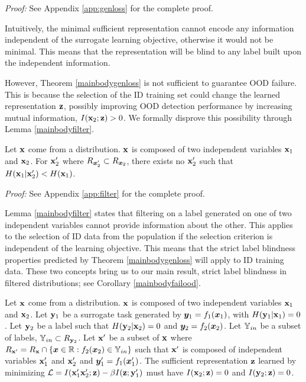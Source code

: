 \textit{Proof:} See Appendix \ref{app:genloss} for the complete proof.

Intuitively, the minimal sufficient representation cannot encode any information independent of the surrogate learning objective, otherwise it would not be minimal. This means that the representation will be blind to any label built upon the independent information.

However, Theorem \ref{mainbodygenloss} is not sufficient to guarantee OOD failure. This is because the selection of the ID training set could change the learned representation ${\mathbf{z}}$, possibly improving OOD detection performance by increasing mutual information, $I({\mathbf{x}}_2;{\mathbf{z}}) > 0$. We formally disprove this possibility through Lemma \ref{mainbodyfilter}.

\begin{lemma}
    Let ${\mathbf{x}}$ come from a distribution. ${\mathbf{x}}$ is composed of two independent variables ${\mathbf{x}}_1$ and ${\mathbf{x}}_2$. For ${\mathbf{x}}_2'$ where $R_{{\bm{x}}_2'} \subset R_{{\bm{x}}_2}$, there exists no ${\mathbf{x}}_2'$ such that $H({\mathbf{x}}_1|{\mathbf{x}}_2') < H({\mathbf{x}}_1)$.
    \label{mainbodyfilter}
\end{lemma}

\textit{Proof:} See Appendix \ref{app:filter} for the complete proof.

Lemma \ref{mainbodyfilter} states that filtering on a label generated on one of two independent variables cannot provide information about the other. This applies to the selection of ID data from the population if the selection criterion is independent of the learning objective. This means that the strict label blindness properties predicted by Theorem \ref{mainbodygenloss} will apply to ID training data. These two concepts bring us to our main result, strict label blindness in filtered distributions; see Corollary \ref{mainbodyfailood}.

\begin{corollary}
    Let ${\mathbf{x}}$ come from a distribution. ${\mathbf{x}}$ is composed of two independent variables ${\mathbf{x}}_1$ and ${\mathbf{x}}_2$. Let ${\mathbf{y}}_1$ be a surrogate task generated by ${\bm{y}}_1 = f_1({\bm{x}}_1)$, with $H({\mathbf{y}}_1|{\mathbf{x}}_1) = 0$. Let ${\mathbf{y}}_2$ be a label such that $H({\mathbf{y}}_2|{\mathbf{x}}_2) = 0$ and ${\bm{y}}_2 = f_2({\bm{x}}_2)$. Let ${\mathbb{Y}}_{in}$ be a subset of labels, ${\mathbb{Y}}_{in} \subset R_{{\mathbf{y}}_2}$. Let ${\mathbf{x}}'$ be a subset of ${\mathbf{x}}$ where $R_{{\mathbf{x}}'} = R_{{\mathbf{x}}} \cap \{{\bm{x}} \in \mathbb{R}: f_2({\bm{x}}_2) \in {\mathbb{Y}}_{in} \}$ such that ${\mathbf{x}}'$ is composed of independent variables ${\mathbf{x}}_1'$ and ${\mathbf{x}}_2'$ and ${\bm{y}}_1' = f_1({\bm{x}}_1')$. The sufficient representation ${\mathbf{z}}$ learned by minimizing $\mathcal{L} = I({\mathbf{x}}_1' {\mathbf{x}}_2'; {\mathbf{z}}) - \beta I({\mathbf{z}};{\mathbf{y}}_1')$ must have $I({\mathbf{x}}_2;{\mathbf{z}}) = 0$ and $I({\mathbf{y}}_2;{\mathbf{z}}) = 0$.
    \label{mainbodyfailood}
\end{corollary}

